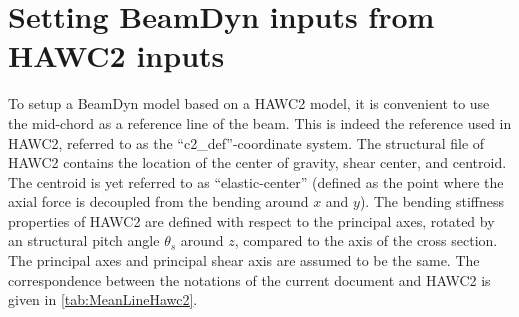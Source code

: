 \documentclass[11pt]{article}
\begin{document}
\section{Setting BeamDyn inputs from HAWC2 inputs}
To setup a BeamDyn model based on a HAWC2 model, it is convenient to use the mid-chord as a reference line of the beam. This is indeed the reference used in HAWC2, referred to as the ``c2\_def''-coordinate system.
%
The structural file of HAWC2 contains the location of the center of gravity, shear center, and  centroid. The centroid is yet referred to as ``elastic-center'' (defined as the point where the axial force is decoupled from the bending around $x$ and $y$).
%
The bending stiffness properties of HAWC2 are defined with respect to the principal axes, rotated by an structural pitch angle $\theta_s$ around $z$, compared to the axis of the cross section. The principal axes and principal shear axis are assumed to be the same.
%
The correspondence between the notations of the current document and HAWC2 is given in \autoref{tab:MeanLineHawc2}.
\end{document}
